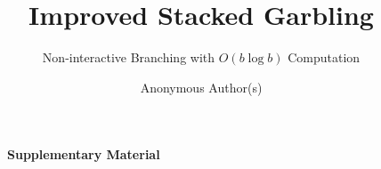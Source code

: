 \documentclass[]{llncs}
\title{%
  Improved Stacked Garbling
}
\subtitle{Non-interactive Branching with $O(b \log b)$ Computation}
\author{Anonymous Author(s)}
\institute{Anonymous Institution}
\author{}
\institute{}
\begin{document}
\maketitle








 
 








\newpage

{\LARGE \bf \verb+    + Supplementary Material}

\begin{appendix}

\end{appendix}
\end{document}
